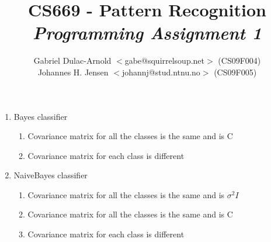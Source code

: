 \documentclass{article}
\author{Gabriel Dulac-Arnold $<$gabe@squirrelsoup.net$>$ (CS09F004) \\
Johannes H. Jensen $<$johannj@stud.ntnu.no$>$ (CS09F005)}
\title{CS669 - Pattern Recognition\\
\emph{Programming Assignment 1}}
\begin{document}
\setlength{\parskip}{2ex}
\maketitle

\begin{enumerate}
\item Bayes classifier
\begin{enumerate}
\item Covariance matrix for all the classes is the same and is C
\item Covariance matrix for each class is different
\end{enumerate}
\item Naive­Bayes classifier
\begin{enumerate}
\item Covariance matrix for all the classes is the same and is $\sigma^2I$
\item Covariance matrix for all the  classes is the same and is C
\item Covariance matrix for each class is different
\end{enumerate}
\end{enumerate}
\end{document}
